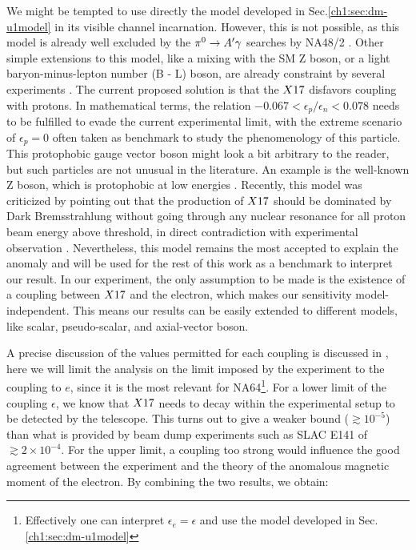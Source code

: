 We might be tempted to use directly the model developed in Sec.\ref{ch1:sec:dm-u1model} in its visible channel incarnation. However, this is not possible, as this model is already well excluded by the $\pi^0 \to A' \gamma$ searches by NA48/2 \cite{na48}. Other simple extensions to this model, like a mixing with the SM Z boson, or a light baryon-minus-lepton number (B - L) boson, are already constraint by several experiments \cite{PhysRevD.95.035017}. The current proposed solution is that the $X17$ disfavors coupling with protons. In mathematical terms, the relation $-0.067 < \epsilon_p/\epsilon_n < 0.078$ needs to be fulfilled to evade the current experimental limit, with the extreme scenario of $\epsilon_p = 0$ often taken as benchmark to study the phenomenology of this particle. This protophobic gauge vector boson might look a bit arbitrary to the reader, but such particles are not unusual in the literature. An example is the well-known Z boson, which is protophobic at low energies \cite{PhysRevD.95.035017}. Recently, this model was criticized by pointing out that the production of $X17$ should be dominated by Dark Bremsstrahlung without going through any nuclear resonance for all proton beam energy above threshold, in direct contradiction with experimental observation \cite{zhang2020protophobic}. Nevertheless, this model remains the most accepted to explain the anomaly and will be used for the rest of this work as a benchmark to interpret our result. In our experiment, the only assumption to be made is the existence of a coupling between $X17$ and the electron, which makes our sensitivity model-independent. This means our results can be easily extended to different models, like scalar, pseudo-scalar, and axial-vector boson.

A precise discussion of the values permitted for each coupling is discussed in \cite{Feng:2016jff,PhysRevD.95.035017}, here we will limit the analysis on the limit imposed by the experiment to the coupling to $e$, since it is the most relevant for NA64\footnote{Effectively one can interpret $\epsilon_e = \epsilon$ and use the model developed in Sec.\ref{ch1:sec:dm-u1model}}. For a lower limit of the coupling $\epsilon$, we know that $X17$ needs to decay within the experimental setup to be detected by the telescope. This turns out to give a weaker bound ($\gtrsim 10^{-5}$) than what is provided by beam dump experiments such as SLAC E141 \cite{blum} of $\gtrsim 2 \times 10^{-4}$. For the upper limit, a coupling too strong would influence the good agreement between the experiment and the theory of the anomalous magnetic moment of the electron. By combining the two results, we obtain:

